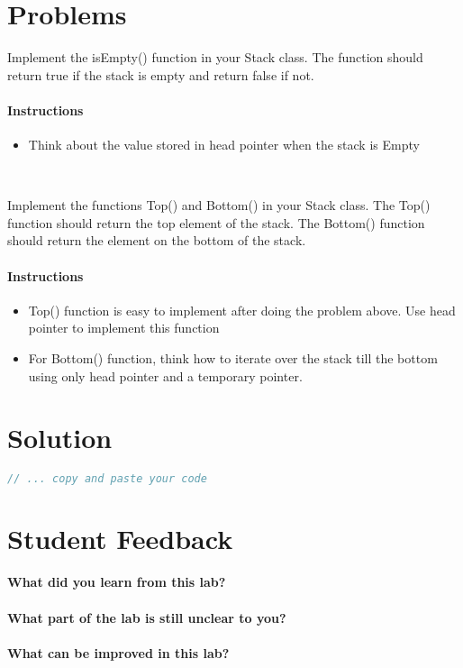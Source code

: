 \documentclass[11pt,fleqn]{book} %
\begin{document}
\section{Problems}
\begin{problem}
  Implement the isEmpty() function in your Stack class. The function should return true if the stack is empty and return false if not.
  \paragraph{Instructions}
  \begin{itemize}
  \item Think about the value stored in head pointer when the stack is Empty
  \end{itemize}
\end{problem}
~\\
\begin{problem}
  Implement the  functions Top() and Bottom() in your Stack class. The Top() function should return the top element of the stack. The Bottom() function should return the element on the bottom of the stack.
  \paragraph{Instructions}
  \begin{itemize}
  \item Top() function is easy to implement after doing the problem above. Use head pointer to implement this function
  \item For Bottom() function, think how to iterate over the stack till the bottom using only head pointer and a temporary pointer.
  \end{itemize}
\end{problem}

\newpage
\section{Solution}
\begin{lstlisting}[language=C++]
  // ... copy and paste your code
\end{lstlisting}

\newpage
\section{Student Feedback}
\textbf{What did you learn from this lab?}\\
\noindent\fbox{\parbox{\textwidth}{
  }
}\\
\textbf{What part of the lab is still unclear to you?}\\
\noindent\fbox{\parbox{\textwidth}{
  }
}\\
\textbf{What can be improved in this lab?}\\ 
\noindent\fbox{\parbox{\textwidth}{
  }
}
\end{document}
